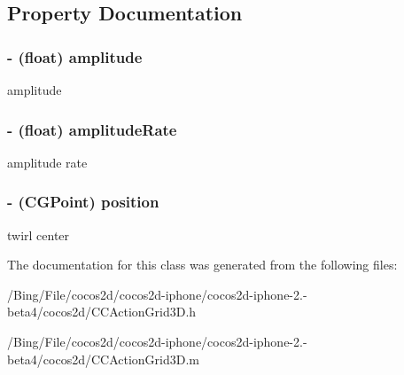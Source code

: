 \subsection{Property Documentation}
\hypertarget{interface_c_c_twirl_abb8aa6adc6cc79d802cb2ef5346be769}{
\subsubsection[{amplitude}]{\setlength{\rightskip}{0pt plus 5cm}-\/ (float) {\bf amplitude}}}\label{interface_c_c_twirl_abb8aa6adc6cc79d802cb2ef5346be769}
amplitude \hypertarget{interface_c_c_twirl_abb2856f816f3756c080f2be00a5a2afd}{
\subsubsection[{amplitude\-Rate}]{\setlength{\rightskip}{0pt plus 5cm}-\/ (float) {\bf amplitude\-Rate}}}\label{interface_c_c_twirl_abb2856f816f3756c080f2be00a5a2afd}
amplitude rate \hypertarget{interface_c_c_twirl_abbac5a09daa5e9be9ed1b9fdc2ce672d}{
\subsubsection[{position}]{\setlength{\rightskip}{0pt plus 5cm}-\/ (C\-G\-Point) {\bf position}}}\label{interface_c_c_twirl_abbac5a09daa5e9be9ed1b9fdc2ce672d}
twirl center 

The documentation for this class was generated from the following files\-:\begin{DoxyCompactItemize}
\item 
/\-Bing/\-File/cocos2d/cocos2d-\/iphone/cocos2d-\/iphone-\/2.-\/beta4/cocos2d/C\-C\-Action\-Grid3\-D.\-h\item 
/\-Bing/\-File/cocos2d/cocos2d-\/iphone/cocos2d-\/iphone-\/2.-\/beta4/cocos2d/C\-C\-Action\-Grid3\-D.\-m\end{DoxyCompactItemize}
